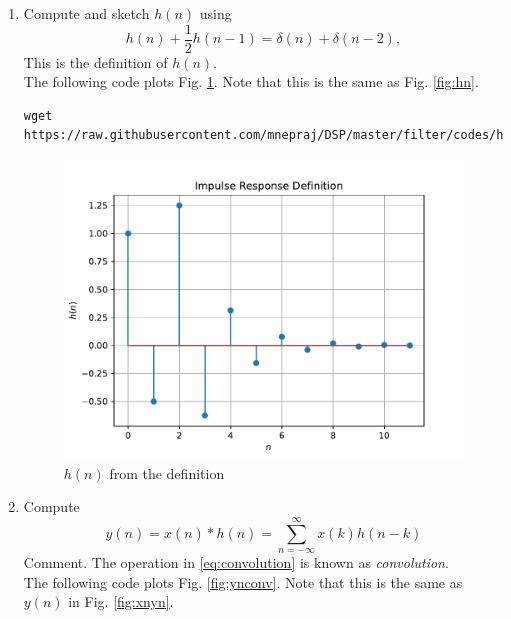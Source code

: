 \documentclass[journal, 12pt, twocolumn]{IEEEtran}
\renewcommand\thesection{\arabic{section}}
\begin{document}
\begin{enumerate}[label=\thesection.\arabic*]
	\item
	      Compute and sketch $h(n)$ using
	      \begin{equation}
		      \label{eq:iir_filter_h}
		      h(n) + \frac{1}{2}h(n-1) = \delta(n) + \delta(n-2),
	      \end{equation}
	      This is the definition of $h(n)$.
	      \\
	      \solution The following code plots Fig. \ref{fig:hndef}. Note that this is the same as Fig.
	      \ref{fig:hn}.
	      \begin{lstlisting}
wget https://raw.githubusercontent.com/mnepraj/DSP/master/filter/codes/hndef.py
\end{lstlisting}
	      \begin{figure}[h]
		      \centering
		      \includegraphics[width=\columnwidth]{./figs/hndef}
		      \caption{$h(n)$ from the definition}
		      \label{fig:hndef}
	      \end{figure}
	\item Compute
	      \begin{equation}
		      \label{eq:convolution}
		      y(n) = x(n)*h(n) = \sum_{n=-\infty}^{\infty}x(k)h(n-k)
	      \end{equation}
	      Comment. The operation in \eqref{eq:convolution} is known as
		      {\em convolution}.
	      \\
	      \solution The following code plots Fig. \ref{fig:ynconv}. Note that this is the same as
	      $y(n)$ in  Fig.
	      \ref{fig:xnyn}.
	      \begin{lstlisting}

\end{lstlisting}
\end{enumerate}
\end{document}
